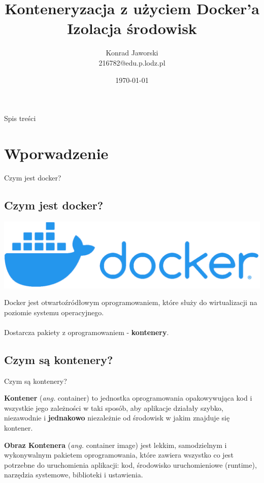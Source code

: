 \documentclass[aspectratio=169]{beamer}
\title{Konteneryzacja z użyciem \textbf{Docker}'a \\Izolacja środowisk}
\date{\today}
\author[Jaworski]{Konrad Jaworski\\216782@edu.p.lodz.pl}
\begin{document}
\begin{frame}
    \titlepage
\end{frame}

\begin{frame}{Spis treści}
    \begin{card}
        \tableofcontents
    \end{card}
\end{frame}

\section{Wporwadzenie}
\begin{frame}{Czym jest docker?}\subsection{Czym jest docker?}

    \centering
    \includegraphics[scale=0.2]{img/logo.png}
    \bigskip

    \begin{card}
        Docker jest otwartoźródłowym oprogramowaniem, które służy do wirtualizacji na poziomie systemu operacyjnego.\\\\
        Dostarcza pakiety z oprogramowaniem - \textbf{kontenery}.
    \end{card}
\end{frame}




\subsection{Czym są kontenery?}
\begin{frame}{Czym są kontenery?}
    \begin{card}
        \textbf{Kontener} (\textit{ang.} container) to jednostka oprogramowania opakowywująca kod i wszystkie jego zależności w taki sposób, aby aplikacje działały szybko, niezawodnie i \textbf{jednakowo} niezależnie od środowisk w jakim znajduje się kontener. 
    \end{card}

    \begin{card}
        \textbf{Obraz Kontenera} (\textit{ang.} container image) jest lekkim, samodzielnym i wykonywalnym pakietem oprogramowania, które zawiera wszystko co jest potrzebne do uruchomienia aplikacji: kod, 
        środowisko uruchomieniowe (runtime), narzędzia systemowe, biblioteki i ustawienia.
    \end{card}
\end{frame}
\end{document}

